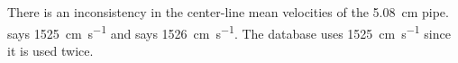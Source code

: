 There is an inconsistency in the center-line mean velocities of the
\SI{5.08}{\cm} pipe.  \citet[p.~371]{StantonTE+1911+eng+JOUR} says
\SI{1525}{\cm\per\s} and \citet[p.~372]{StantonTE+1911+eng+JOUR} says
\SI{1526}{\cm\per\s}.  The database uses \SI{1525}{\cm\per\s} since it is used
twice.
